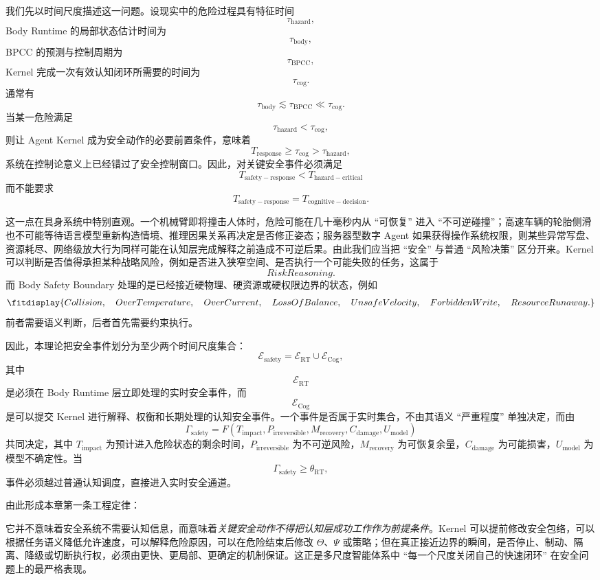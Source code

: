 我们先以时间尺度描述这一问题。设现实中的危险过程具有特征时间
\[
\tau_{\mathrm{hazard}},
\]
Body Runtime 的局部状态估计时间为
\[
\tau_{\mathrm{body}},
\]
BPCC 的预测与控制周期为
\[
\tau_{\mathrm{BPCC}},
\]
Kernel 完成一次有效认知闭环所需要的时间为
\[
\tau_{\mathrm{cog}}.
\]
通常有
\[
\tau_{\mathrm{body}}
\lesssim
\tau_{\mathrm{BPCC}}
\ll
\tau_{\mathrm{cog}}.
\]
当某一危险满足
\[
\tau_{\mathrm{hazard}}
<
\tau_{\mathrm{cog}},
\]
则让 Agent Kernel 成为安全动作的必要前置条件，意味着
\[
T_{\mathrm{response}}
\geq
\tau_{\mathrm{cog}}
>
\tau_{\mathrm{hazard}},
\]
系统在控制论意义上已经错过了安全控制窗口。因此，对关键安全事件必须满足
\[
\boxed{
T_{\mathrm{safety-response}}
<
T_{\mathrm{hazard-critical}}
}
\]
而不能要求
\[
T_{\mathrm{safety-response}}
=
T_{\mathrm{cognitive-decision}}.
\]

这一点在具身系统中特别直观。一个机械臂即将撞击人体时，危险可能在几十毫秒内从 ``可恢复'' 进入 ``不可逆碰撞''；高速车辆的轮胎侧滑也不可能等待语言模型重新构造情境、推理因果关系再决定是否修正姿态；服务器型数字 Agent 如果获得操作系统权限，则某些异常写盘、资源耗尽、网络级放大行为同样可能在认知层完成解释之前造成不可逆后果。由此我们应当把 ``安全'' 与普通 ``风险决策'' 区分开来。Kernel 可以判断是否值得承担某种战略风险，例如是否进入狭窄空间、是否执行一个可能失败的任务，这属于
\[
RiskReasoning.
\]
而 Body Safety Boundary 处理的是已经接近硬物理、硬资源或硬权限边界的状态，例如
\[
\fitdisplay{
Collision,\quad
OverTemperature,\quad
OverCurrent,\quad
LossOfBalance,\quad
UnsafeVelocity,\quad
ForbiddenWrite,\quad
ResourceRunaway.
}
\]
前者需要语义判断，后者首先需要约束执行。

因此，本理论把安全事件划分为至少两个时间尺度集合：
\[
\mathcal E_{\mathrm{safety}}
=
\mathcal E_{\mathrm{RT}}
\cup
\mathcal E_{\mathrm{Cog}},
\]
其中
\[
\mathcal E_{\mathrm{RT}}
\]
是必须在 Body Runtime 层立即处理的实时安全事件，而
\[
\mathcal E_{\mathrm{Cog}}
\]
是可以提交 Kernel 进行解释、权衡和长期处理的认知安全事件。一个事件是否属于实时集合，不由其语义 ``严重程度'' 单独决定，而由
\[
\Gamma_{\mathrm{safety}}
=
F(
T_{\mathrm{impact}},
P_{\mathrm{irreversible}},
M_{\mathrm{recovery}},
C_{\mathrm{damage}},
U_{\mathrm{model}}
)
\]
共同决定，其中 $T_{\mathrm{impact}}$ 为预计进入危险状态的剩余时间，$P_{\mathrm{irreversible}}$ 为不可逆风险，$M_{\mathrm{recovery}}$ 为可恢复余量，$C_{\mathrm{damage}}$ 为可能损害，$U_{\mathrm{model}}$ 为模型不确定性。当
\[
\Gamma_{\mathrm{safety}}
\geq
\theta_{\mathrm{RT}},
\]
事件必须越过普通认知调度，直接进入实时安全通道。

由此形成本章第一条工程定律：
\begin{statementbox}
\centering
{}
\end{statementbox}
它并不意味着安全系统不需要认知信息，而意味着\emph{关键安全动作不得把认知层成功工作作为前提条件}。Kernel 可以提前修改安全包络，可以根据任务语义降低允许速度，可以解释危险原因，可以在危险结束后修改 $\Theta$、$\Psi$ 或策略；但在真正接近边界的瞬间，是否停止、制动、隔离、降级或切断执行权，必须由更快、更局部、更确定的机制保证。这正是多尺度智能体系中 ``每一个尺度关闭自己的快速闭环'' 在安全问题上的最严格表现。

